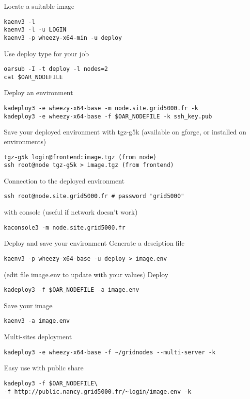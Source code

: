 Locate a suitable image
\begin{lstlisting}
kaenv3 -l
kaenv3 -l -u LOGIN
kaenv3 -p wheezy-x64-min -u deploy
\end{lstlisting}
\makeruleinbox

Use deploy type for your job
\begin{lstlisting}
oarsub -I -t deploy -l nodes=2
cat $OAR_NODEFILE
\end{lstlisting}
\makeruleinbox

Deploy an environment
\begin{lstlisting}
kadeploy3 -e wheezy-x64-base -m node.site.grid5000.fr -k
kadeploy3 -e wheezy-x64-base -f $OAR_NODEFILE -k ssh_key.pub
\end{lstlisting}
\makeruleinbox

Save your deployed environment with tgz-g5k
(available on gforge, or installed on environments)
\begin{lstlisting}
tgz-g5k login@frontend:image.tgz (from node)
ssh root@node tgz-g5k > image.tgz (from frontend)
\end{lstlisting}
\makeruleinbox

Connection to the deployed environment
\begin{lstlisting}
ssh root@node.site.grid5000.fr # password "grid5000"
\end{lstlisting}
with console (useful if network doesn't work)
\begin{lstlisting}
kaconsole3 -m node.site.grid5000.fr
\end{lstlisting}
\makeruleinbox

Deploy and save your environment
Generate a desciption file
\begin{lstlisting}
kaenv3 -p wheezy-x64-base -u deploy > image.env
\end{lstlisting}
(edit file image.env to update with your values)
Deploy
\begin{lstlisting}
kadeploy3 -f $OAR_NODEFILE -a image.env
\end{lstlisting}
Save your image
\begin{lstlisting}
kaenv3 -a image.env
\end{lstlisting}
\makeruleinbox

Multi-sites deployment
\begin{lstlisting}
kadeploy3 -e wheezy-x64-base -f ~/gridnodes --multi-server -k
\end{lstlisting}
Easy use with public share
\begin{lstlisting}
kadeploy3 -f $OAR_NODEFILE\
-f http://public.nancy.grid5000.fr/~login/image.env -k
\end{lstlisting}